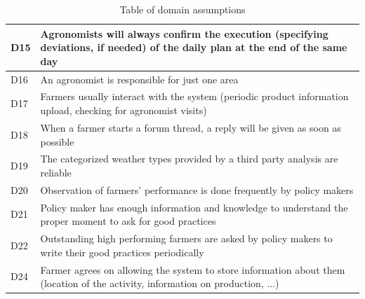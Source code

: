 \begin{table}[H]
\begin{tabular}{|l|m{}|}
        \hline
        \textsc{D15}  &    Agronomists will always confirm the execution (specifying deviations, if needed) of the daily plan at the end of the same day\\
        \hline
        \textsc{D16}  &    An agronomist is responsible for just one area\\
        \hline
        \textsc{D17}  &    Farmers usually interact with the system (periodic product information upload, checking for agronomist visits) \\
        \hline
        \textsc{D18}     &   When a farmer starts a forum thread, a reply will be given as soon as possible \\
        \hline
        \textsc{D19}  &    The categorized weather types provided by a third party analysis are reliable\\
        \hline
        \textsc{D20}  &    Observation of  farmers' performance is done frequently by policy makers\\
        \hline
        \textsc{D21}  &    Policy maker has enough information and knowledge to understand the proper moment to ask for good practices\\
        \hline
        \textsc{D22}  &    Outstanding high performing farmers are asked by policy makers to write their good practices periodically\\
        \hline
        \textsc{D24}  &    Farmer agrees on allowing the system to store information about them (location of the activity, information on production, ...)\\
        \hline
        
    \end{tabular}
    
    \caption{\label{tab:domainAssumptions}Table of domain assumptions}
    
\end{table}

